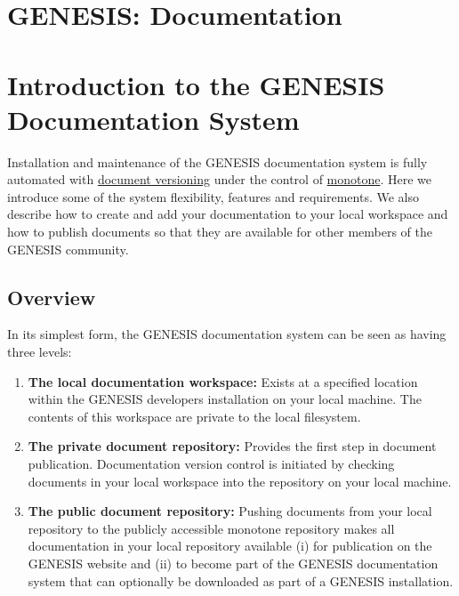 \documentclass[12pt]{article}
\begin{document}
\section*{GENESIS: Documentation}

\section*{Introduction to the GENESIS Documentation System}

Installation and maintenance of the GENESIS documentation system is fully automated with \href{../document-versionctrl/document-versionctrl.pdf}{document versioning} under the control of \href{http://monotone.ca/}{monotone}. Here we introduce some of the system flexibility, features and requirements. We also describe how to create and add your documentation to your local workspace and how to publish documents so that they are available for other members of the GENESIS community.

\subsection*{Overview}

In its simplest form, the GENESIS documentation system can be seen as having three levels:
\begin{enumerate}

\item {\bf The local documentation workspace:} Exists at a specified location within the GENESIS developers installation on your local machine. The contents of this workspace are private to the local filesystem.

\item {\bf The private document repository:} Provides the first step in document publication. Documentation version control is initiated by checking documents in your local workspace into the repository on your local machine.

\item {\bf The public document repository:} Pushing documents from your local repository to the publicly accessible monotone repository makes all documentation in your local repository available (i) for publication on the GENESIS website and (ii) to become part of the GENESIS documentation system that can optionally be downloaded as part of a GENESIS installation.


\end{enumerate}
\end{document}
